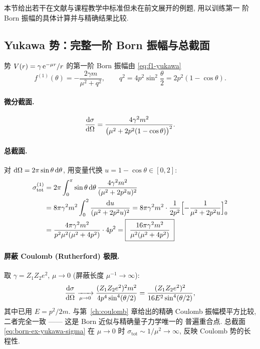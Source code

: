 本节给出若干在文献与课程教学中标准但未在前文展开的例题, 用以训练第一
阶 Born 振幅的具体计算并与精确结果比较.

\subsection{Yukawa 势：完整一阶 Born 振幅与总截面}

势 $V(r)=\gamma\,\mathrm{e}^{-\mu r}/r$ 的第一阶 Born 振幅由 \eqref{eq:f1-yukawa}
\begin{equation}
f^{(1)}(\theta)=-\frac{2\gamma m}{\mu^{2}+q^{2}},\qquad
q^{2}=4p^{2}\sin^{2}\frac{\theta}{2}=2p^{2}(1-\cos\theta).
\label{eq:born-ex-yukawa-f}
\end{equation}

\paragraph{微分截面.}
\begin{equation}
\frac{\mathrm{d}\sigma}{\mathrm{d}\Omega}=\frac{4\gamma^{2}m^{2}}{\bigl(\mu^{2}+2p^{2}(1-\cos\theta)\bigr)^{2}}.
\label{eq:born-ex-yukawa-dsigma}
\end{equation}

\paragraph{总截面.}
对 $\mathrm{d}\Omega=2\pi\sin\theta\,\mathrm{d}\theta$, 用变量代换 $u=1-\cos\theta\in[0,2]$:
\begin{align}
\sigma_{\text{tot}}^{(1)}
&=2\pi\int_{0}^{\pi}\sin\theta\,\mathrm{d}\theta\,\frac{4\gamma^{2}m^{2}}{(\mu^{2}+2p^{2}u)^{2}}\notag\\
&=8\pi\gamma^{2}m^{2}\int_{0}^{2}\frac{\mathrm{d} u}{(\mu^{2}+2p^{2}u)^{2}}
=8\pi\gamma^{2}m^{2}\cdot\frac{1}{2p^{2}}\Bigl[-\frac{1}{\mu^{2}+2p^{2}u}\Bigr]_{0}^{2}\notag\\
&=\frac{4\pi\gamma^{2}m^{2}}{p^{2}\mu^{2}(\mu^{2}+4p^{2})}\cdot 4p^{2}
=\boxed{\;\frac{16\pi\gamma^{2}m^{2}}{\mu^{2}(\mu^{2}+4p^{2})}\;}
\label{eq:born-ex-yukawa-sigma}
\end{align}

\paragraph{屏蔽 Coulomb (Rutherford) 极限.}
取 $\gamma=Z_{1}Z_{2}e^{2}$, $\mu\to 0$ (屏蔽长度 $\mu^{-1}\to\infty$):
\begin{equation}
\frac{\mathrm{d}\sigma}{\mathrm{d}\Omega}
\xrightarrow[\mu\to 0]{}\frac{(Z_{1}Z_{2}e^{2})^{2}m^{2}}{4p^{4}\sin^{4}(\theta/2)}
=\frac{(Z_{1}Z_{2}e^{2})^{2}}{16E^{2}\sin^{4}(\theta/2)},
\label{eq:born-ex-rutherford}
\end{equation}
其中已用 $E=p^{2}/2m$. 与第~\ref{ch:coulomb} 章给出的精确 Coulomb
振幅模平方比较, 二者完全一致 —— 这是 Born 近似与精确量子力学唯一的
普遍重合点. 总截面 \eqref{eq:born-ex-yukawa-sigma} 在 $\mu\to 0$ 时
$\sigma_{\text{tot}}\sim 1/\mu^{2}\to\infty$, 反映 Coulomb 势的长程性.

